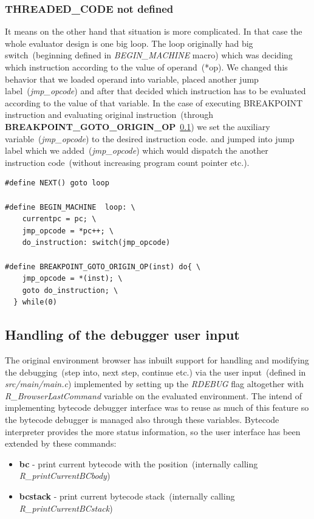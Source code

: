\documentclass[thesis=M,english]{FITthesis}[2018/10/20]
\begin{document}
\subsubsection{THREADED{\_}CODE not defined}
It means on the other hand that situation is more complicated. In that case the whole evaluator design is one big loop. The loop originally had big switch~(beginning defined in \textit{BEGIN{\_}MACHINE} macro) which was deciding which instruction according to the value of operand~(*op). We changed this behavior that we loaded operand into variable, placed another jump label~(\textit{jmp{\_}opcode}) and after that decided which instruction has to be evaluated according to the value of that variable. In the case of executing BREAKPOINT instruction and evaluating original instruction~(through \textbf{BREAKPOINT{\_}GOTO{\_}ORIGIN{\_}OP}~\ref{}) we set the auxiliary variable~(\textit{jmp{\_}opcode}) to the desired instruction code.  and jumped into jump label which we added~(\textit{jmp{\_}opcode}) which would dispatch the another instruction code~(without increasing program count pointer etc.).

\begin{lstlisting}
#define NEXT() goto loop

#define BEGIN_MACHINE  loop: \
    currentpc = pc; \
    jmp_opcode = *pc++; \
    do_instruction: switch(jmp_opcode)

#define BREAKPOINT_GOTO_ORIGIN_OP(inst) do{ \
    jmp_opcode = *(inst); \
    goto do_instruction; \
  } while(0)
\end{lstlisting}

\subsection{Handling of the debugger user input}

The original environment browser has inbuilt support for handling and modifying the debugging~(step into, next step, continue etc.) via the user input~(defined in \textit{src/main/main.c}) implemented by setting up the \textit{RDEBUG} flag altogether with \textit{R{\_}BrowserLastCommand} variable on the evaluated environment. The intend of implementing bytecode debugger interface was to reuse as much of this feature so the bytecode debugger is managed also through these variables. Bytecode interpreter provides the more status information, so the user interface has been extended by these commands:

\begin{itemize}
	\item \textbf{bc} - print current bytecode with the position~(internally calling \textit{R{\_}printCurrentBCbody})
	\item \textbf{bcstack} - print current bytecode stack~(internally calling \textit{R{\_}printCurrentBCstack})
\end{itemize}
\end{document}
